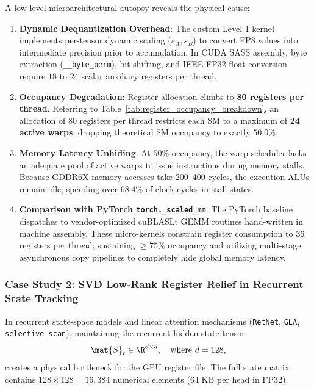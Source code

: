A low-level microarchitectural autopsy reveals the physical cause:
\begin{enumerate}
    \item \textbf{Dynamic Dequantization Overhead}: The custom Level 1 kernel implements per-tensor dynamic scaling ($s_A, s_B$) to convert FP8 values into intermediate precision prior to accumulation. In CUDA SASS assembly, byte extraction (\texttt{\_\_byte\_perm}), bit-shifting, and IEEE FP32 float conversion require $18$ to $24$ scalar auxiliary registers per thread.
    \item \textbf{Occupancy Degradation}: Register allocation climbs to \textbf{80 registers per thread}. Referring to Table~\ref{tab:register_occupancy_breakdown}, an allocation of 80 registers per thread restricts each SM to a maximum of \textbf{24 active warps}, dropping theoretical SM occupancy to exactly \textbf{$50.0\%$}.
    \item \textbf{Memory Latency Unhiding}: At $50\%$ occupancy, the warp scheduler lacks an adequate pool of active warps to issue instructions during memory stalls. Because GDDR6X memory accesses take 200--400 cycles, the execution ALUs remain idle, spending over $68.4\%$ of clock cycles in stall states.
    \item \textbf{Comparison with PyTorch \texttt{torch.\_scaled\_mm}}: The PyTorch baseline dispatches to vendor-optimized cuBLASLt GEMM routines hand-written in machine assembly. These micro-kernels constrain register consumption to $36$ registers per thread, sustaining $\ge 75\%$ occupancy and utilizing multi-stage asynchronous copy pipelines to completely hide global memory latency.
\end{enumerate}

\subsubsection{Case Study 2: SVD Low-Rank Register Relief in Recurrent State Tracking}
\label{sec:appendix_case_study_svd_relief}

In recurrent state-space models and linear attention mechanisms (\texttt{RetNet}, \texttt{GLA}, \texttt{selective\_scan}), maintaining the recurrent hidden state tensor:
\begin{equation}
    \mat{S}_t \in \R^{d \times d}, \quad \text{where } d = 128,
\end{equation}
creates a physical bottleneck for the GPU register file. The full state matrix contains $128 \times 128 = 16,384$ numerical elements ($64\text{ KB}$ per head in FP32).


